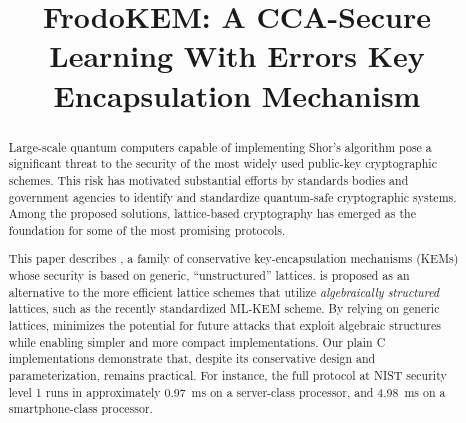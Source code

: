 \documentclass[version=submission]{iacrcc}
\title[running  = {FrodoKEM: A CCA-Secure Learning With Errors Key Encapsulation Mechanism}]
                  {FrodoKEM: A CCA-Secure Learning With Errors Key Encapsulation Mechanism}
\begin{document}
\listoffixmes

\maketitle


\begin{abstract}
  Large-scale quantum computers capable of implementing Shor's algorithm pose a significant threat to the security of the most widely used public-key cryptographic schemes.
  This risk has motivated substantial efforts by standards bodies and government agencies to identify and standardize quantum-safe cryptographic systems.
  Among the proposed solutions, lattice-based cryptography has emerged as the foundation for some of the most promising protocols.

  This paper describes \FrodoKEM, a family of conservative key-encapsulation mechanisms (KEMs) whose security is based on generic, “unstructured” lattices.
  \FrodoKEM is proposed as an alternative to the more efficient lattice schemes that utilize \emph{algebraically structured} lattices, such as the recently standardized ML-KEM scheme.
  By relying on generic lattices, \FrodoKEM minimizes the potential for future attacks that exploit algebraic structures while enabling simpler and more compact implementations.
  Our plain C implementations demonstrate that, despite its conservative design and parameterization, \FrodoKEM remains practical.
  For instance, the full protocol at NIST security level 1 runs in approximately 0.97~ms on a server-class processor, and 4.98~ms on a smartphone-class processor.



\end{abstract}
\end{document}

